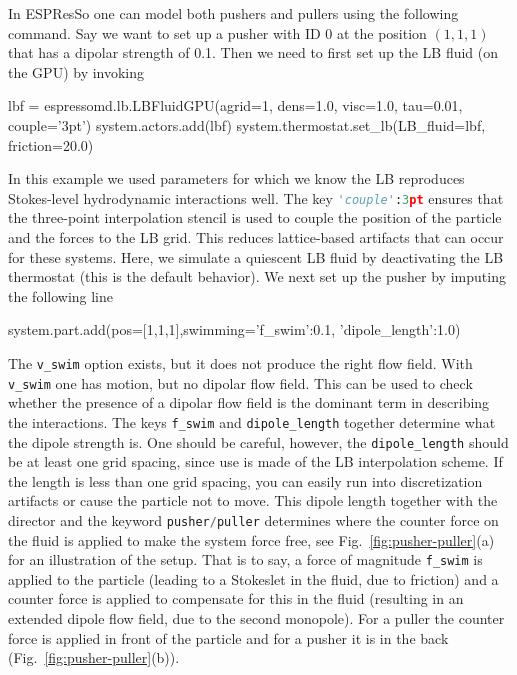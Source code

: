 \documentclass[aip,jcp,reprint,a4paper,onecolumn,amsmath]{revtex4-1}
\newcommand{\es}{\mbox{\textsf{ESPResSo}}\xspace}
\newcommand\codees{\lstinline[language=python]}
\begin{document}
In \es{} one can model both pushers and pullers using the following command.
Say we want to set up a pusher with ID 0 at the position $(1,1,1)$ that has a
dipolar strength of 0.1. Then we need to first set up the LB fluid (on the GPU)
by invoking
\begin{espresso}
lbf = espressomd.lb.LBFluidGPU(agrid=1, dens=1.0, visc=1.0, tau=0.01, couple='3pt')
system.actors.add(lbf)
system.thermostat.set_lb(LB_fluid=lbf, friction=20.0)
\end{espresso}
In this example we used parameters for which we know the LB reproduces
Stokes-level hydrodynamic interactions well. The key \codees{'couple':3pt}
ensures that the three-point interpolation stencil is used to couple the
position of the particle and the forces to the LB grid. This reduces
lattice-based artifacts that can occur for these systems. Here, we simulate a
quiescent LB fluid by deactivating the LB thermostat (this is the default
behavior). We next set up the pusher by imputing the following line
\begin{espresso}
system.part.add(pos=[1,1,1],swimming={'f_swim':0.1, 'dipole_length':1.0})
\end{espresso}
The \codees{v_swim} option exists, but it does not produce the right flow
field. With \codees{v_swim} one has motion, but no dipolar flow field. This can
be used to check whether the presence of a dipolar flow field is the dominant
term in describing the interactions. The keys \codees{f_swim} and
\codees{dipole_length} together determine what the dipole strength is. One
should be careful, however, the \codees{dipole_length} should be at least one
grid spacing, since use is made of the LB interpolation scheme. If the length
is less than one grid spacing, you can easily run into discretization artifacts
or cause the particle not to move. This dipole length together with the
director and the keyword \codees{pusher/puller} determines where the counter
force on the fluid is applied to make the system force free, see
Fig.~\ref{fig:pusher-puller}(a) for an illustration of the setup. That is to
say, a force of magnitude \codees{f_swim} is applied to the particle (leading
to a Stokeslet in the fluid, due to friction) and a counter force is applied to
compensate for this in the fluid (resulting in an extended dipole flow field,
due to the second monopole). For a puller the counter force is applied in front
of the particle and for a pusher it is in the back
(Fig.~\ref{fig:pusher-puller}(b)).
\end{document}
